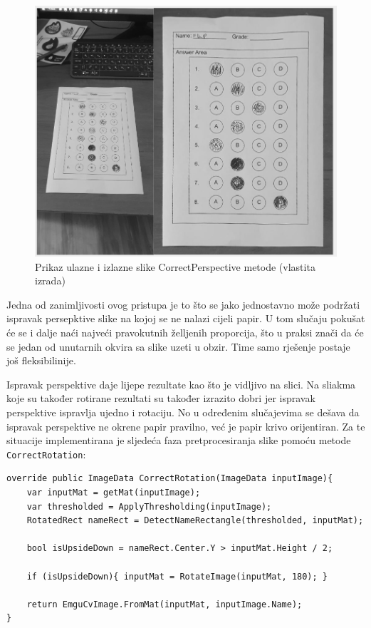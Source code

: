 \documentclass{foi}
\begin{document}
\begin{figure}[H]
\centering
\includegraphics[width=0.8\linewidth]{slike/PerspectiveComparison.png}
\caption{Prikaz ulazne i izlazne slike CorrectPerspective metode (vlastita izrada)}
\end{figure}

Jedna od zanimljivosti ovog pristupa je to što se jako jednostavno može podržati ispravak persepktive slike na kojoj se ne nalazi cijeli papir. U tom slučaju pokušat će se i dalje naći najveći pravokutnih želljenih proporcija, što u praksi znači da će se jedan od unutarnih okvira sa slike uzeti u obzir. Time samo rješenje postaje još fleksibilinije.

Ispravak perspektive daje lijepe rezultate kao što je vidljivo na slici. Na sliakma koje su također rotirane rezultati su također izrazito dobri jer ispravak perspektive ispravlja ujedno i rotaciju. No u određenim slučajevima se dešava da ispravak perspektive ne okrene papir pravilno, već je papir krivo orijentiran. Za te situacije implementirana je sljedeća faza pretprocesiranja slike pomoću metode \texttt{CorrectRotation}:

\begin{lstlisting}[caption={Metoda za provjeru i ispravak orijentacije slike}]
override public ImageData CorrectRotation(ImageData inputImage){
    var inputMat = getMat(inputImage);
    var thresholded = ApplyThresholding(inputImage);
    RotatedRect nameRect = DetectNameRectangle(thresholded, inputMat);

    bool isUpsideDown = nameRect.Center.Y > inputMat.Height / 2;

    if (isUpsideDown){ inputMat = RotateImage(inputMat, 180); }

    return EmguCvImage.FromMat(inputMat, inputImage.Name);
}
\end{lstlisting}
\end{document}
